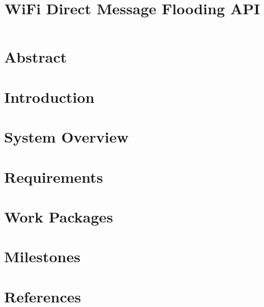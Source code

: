 \documentclass[10pt,a4paper]{report}
\title{WiFi Direct Message Flooding API}
\begin{document}
	
	\maketitle
	
	\section{Abstract}
	
	\section{Introduction}
	
	\section{System Overview}
	
	\section{Requirements}
	
	\section{Work Packages}
	
	\section{Milestones}
	
	\section{References}
	
\end{document}
